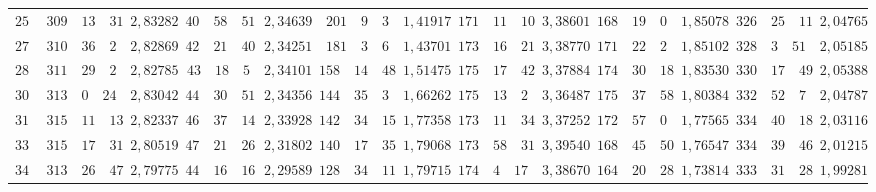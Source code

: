 \begin{landscape}
\begin{center}
\begin{tabular}{r|r|r|r|r|r|r|r|r|r|r|r|r}
\(255\) & \(309\quad 13\quad 31\) & \(2{,}83282\) & \(40\quad 58\quad 51\) & \(2{,}34639\) & \(201\quad 9\quad 3\) & \(1{,}41917\) & \(171\quad 11\quad 10\) & \(3{,}38601\) & \(168\quad 19\quad 0\) & \(1{,}85078\) & \(326\quad 25\quad 11\) & \(2{,}04765\) \\
\(270\) & \(310\quad 36\quad 2\) & \(2{,}82869\) & \(42\quad 21\quad 40\) & \(2{,}34251\) & \(181\quad 3\quad 6\) & \(1{,}43701\) & \(173\quad 16\quad 21\) & \(3{,}38770\) & \(171\quad 22\quad 2\) & \(1{,}85102\) & \(328\quad 3\quad 51\) & \(2{,}05185\) \\
\(285\) & \(311\quad 29\quad 2\) & \(2{,}82785\) & \(43\quad 18\quad 5\) & \(2{,}34101\) & \(158\quad 14\quad 48\) & \(1{,}51475\) & \(175\quad 17\quad 42\) & \(3{,}37884\) & \(174\quad 30\quad 18\) & \(1{,}83530\) & \(330\quad 17\quad 49\) & \(2{,}05388\) \\[3pt]
\(300\) & \(313\quad 0\quad 24\) & \(2{,}83042\) & \(44\quad 30\quad 51\) & \(2{,}34356\) & \(144\quad 35\quad 3\) & \(1{,}66262\) & \(175\quad 13\quad 2\) & \(3{,}36487\) & \(175\quad 37\quad 58\) & \(1{,}80384\) & \(332\quad 52\quad 7\) & \(2{,}04787\) \\
\(315\) & \(315\quad 11\quad 13\) & \(2{,}82337\) & \(46\quad 37\quad 14\) & \(2{,}33928\) & \(142\quad 34\quad 15\) & \(1{,}77358\) & \(173\quad 11\quad 34\) & \(3{,}37252\) & \(172\quad 57\quad 0\) & \(1{,}77565\) & \(334\quad 40\quad 18\) & \(2{,}03116\) \\
\(330\) & \(315\quad 17\quad 31\) & \(2{,}80519\) & \(47\quad 21\quad 26\) & \(2{,}31802\) & \(140\quad 17\quad 35\) & \(1{,}79068\) & \(173\quad 58\quad 31\) & \(3{,}39540\) & \(168\quad 45\quad 50\) & \(1{,}76547\) & \(334\quad 39\quad 46\) & \(2{,}01215\) \\
\(345\) & \(313\quad 26\quad 47\) & \(2{,}79775\) & \(44\quad 16\quad 16\) & \(2{,}29589\) & \(128\quad 34\quad 11\) & \(1{,}79715\) & \(174\quad 4\quad 17\) & \(3{,}38670\) & \(164\quad 20\quad 28\) & \(1{,}73814\) & \(333\quad 31\quad 28\) & \(1{,}99281\) \\
\end{tabular}
\end{center}
\endgroup
\end{landscape}
